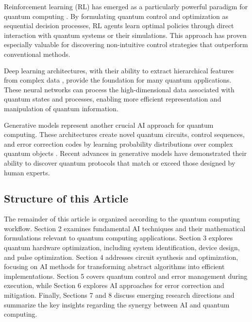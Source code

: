 Reinforcement learning (RL) has emerged as a particularly powerful paradigm for quantum computing \cite{arulkumaran2017deep, shakya2023reinforcement}. By formulating quantum control and optimization as sequential decision processes, RL agents learn optimal policies through direct interaction with quantum systems or their simulations. This approach has proven especially valuable for discovering non-intuitive control strategies that outperform conventional methods.

Deep learning architectures, with their ability to extract hierarchical features from complex data \cite{lecun2015deep}, provide the foundation for many quantum applications. These neural networks can process the high-dimensional data associated with quantum states and processes, enabling more efficient representation and manipulation of quantum information.

Generative models represent another crucial AI approach for quantum computing. These architectures create novel quantum circuits, control sequences, and error correction codes by learning probability distributions over complex quantum objects \cite{bernardo2007generative}. Recent advances in generative models have demonstrated their ability to discover quantum protocols that match or exceed those designed by human experts.

\subsection{Structure of this Article}

The remainder of this article is organized according to the quantum computing workflow. Section 2 examines fundamental AI techniques and their mathematical formulations relevant to quantum computing applications. Section 3 explores quantum hardware optimization, including system identification, device design, and pulse optimization. Section 4 addresses circuit synthesis and optimization, focusing on AI methods for transforming abstract algorithms into efficient implementations. Section 5 covers quantum control and error management during execution, while Section 6 explores AI approaches for error correction and mitigation. Finally, Sections 7 and 8 discuss emerging research directions and summarize the key insights regarding the synergy between AI and quantum computing. 